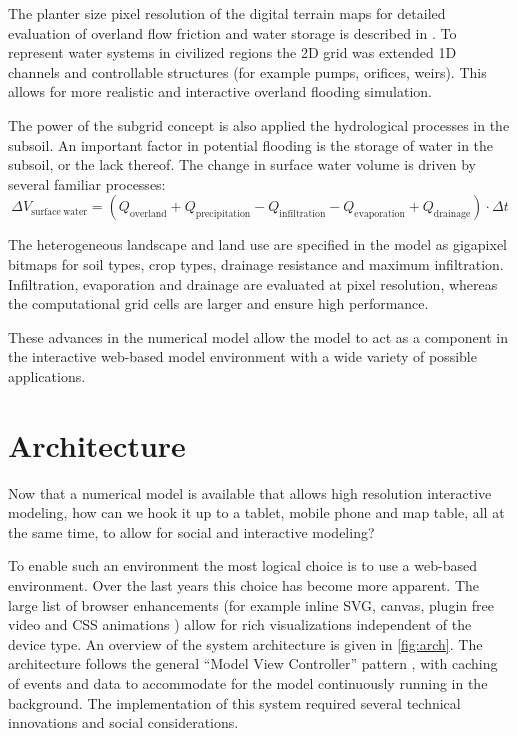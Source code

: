 \documentclass[a4paper]{article}
\begin{document}
The planter size pixel resolution of the digital terrain maps for detailed evaluation of overland flow friction and water storage is described in \citet{Stelling2012}. To represent water systems in civilized regions the 2D grid was extended 1D channels and controllable structures (for example pumps, orifices, weirs). This allows for more realistic and interactive overland flooding simulation.

The power of the subgrid concept is also applied the hydrological processes in the subsoil. An important factor in potential flooding is the storage of water in the subsoil, or the lack thereof. The change in surface water volume is driven by several familiar processes:
\[
\Delta V_\mathrm{surface\ water} = (Q_\mathrm{overland} + Q_\mathrm{precipitation} - Q_\mathrm{infiltration} - Q_\mathrm{evaporation} + Q_\mathrm{drainage})\cdot\Delta t
\]

The heterogeneous landscape and land use are specified in the model as gigapixel bitmaps for soil types, crop types, drainage resistance and maximum infiltration.  Infiltration, evaporation and drainage are evaluated at pixel resolution, whereas the computational grid cells are larger and ensure high performance.

These advances in the numerical model allow the model to act as a component in the interactive web-based model environment with a wide variety of possible applications.


\section{Architecture}
Now that a numerical model is available that allows high resolution interactive modeling, how can we hook it up to a tablet, mobile phone and map table, all at the same time, to allow for social and interactive modeling?

To enable such an environment the most logical choice is to use a web-based environment. Over the last years this choice has become more apparent. The large list of browser enhancements (for example inline \ac{SVG}, canvas, plugin free video \citep{Berjon2014} and \ac{CSS} animations \citep{Jackson2013}) allow for rich visualizations independent of the device type. An overview of the system architecture is given in \autoref{fig:arch}. The architecture follows the general ``Model View Controller'' pattern \citep{Gamma1994}, with caching of events and data to accommodate for the model continuously running in the background. The implementation of this system required several technical innovations and social considerations.
\end{document}
